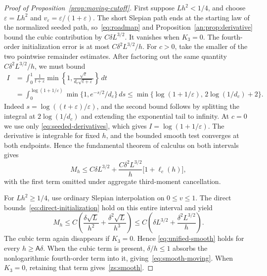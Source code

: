 \documentclass[11pt,letterpaper]{article}
\theoremstyle{remark}
\newcommand{\dd}{\,d}
\begin{document}
\begin{proof}[Proof of Proposition~\ref{prop:moving-cutoff}]
First suppose \(Lh^2<1/4\), and choose
\(\varepsilon=Lh^2\) and \(v_\varepsilon=\varepsilon/(1+\varepsilon)\).
The short Slepian path ends at the starting law of the normalized
seeded path, so~\eqref{eq:roadmap} and
Proposition~\ref{an:prop:derivative} bound the cubic contribution by
\(C\delta L^{3/2}\). It vanishes when \(K_3=0\).
The fourth-order initialization error is at most
\(C\delta^2 L^{3/2}/h\). For \(c>0\), take the smaller of the two
pointwise remainder estimates. After factoring out the same quantity
\(C\delta^2 L^{3/2}/h\), we must bound
\begin{align*}
 I&=\int_0^1\frac1{t+\varepsilon}
 \min\left\{1,\frac{\sqrt{\varepsilon}}{d_c\sqrt{t+\varepsilon}}\right\}\dd t\\
 &=\int_0^{\log(1+1/\varepsilon)}\min\{1,e^{-s/2}/d_c\}\dd s
 \le\min\{\log(1+1/\varepsilon),\,2\log(1/d_c)+2\}.
\end{align*}
Indeed \(s=\log((t+\varepsilon)/\varepsilon)\), and the second
bound follows by splitting the integral at \(2\log(1/d_c)\) and
extending the exponential tail to infinity. At \(c=0\) we use only
\eqref{eq:seeded-derivatives}, which gives \(I=\log(1+1/\varepsilon)\).
The derivative is integrable for fixed \(h\), and the bounded smooth
test converges at both endpoints. Hence the fundamental theorem of
calculus on both intervals gives
\begin{equation}
 M_h\le C\delta L^{3/2}
  +\frac{C\delta^2L^{3/2}}h
       \bigl[1+\ell_c(h)\bigr],
 \label{eq:unified-smooth}
\end{equation}
with the first term omitted under aggregate third-moment cancellation.

For \(Lh^2\ge1/4\), use ordinary Slepian interpolation on
\(0\le v\le1\). The direct bounds~\eqref{eq:direct-initialization}
hold on this entire interval and yield
\[
 M_h\le C\left(\frac{\delta\sqrt L}{h^2}
                   +\frac{\delta^2\sqrt L}{h^3}\right)
 \le C\left(\delta L^{3/2}+\frac{\delta^2L^{3/2}}h\right).
\]
The cubic term again disappears if \(K_3=0\). Hence
\eqref{eq:unified-smooth} holds for every \(h\ge\mathsf A\delta\).
When the cubic term is present, \(\delta/h\le1\) absorbs the
nonlogarithmic fourth-order term into it, giving~\eqref{eq:smooth-moving}.
When \(K_3=0\), retaining that term gives~\eqref{zs:smooth}.
\end{proof}
\end{document}
